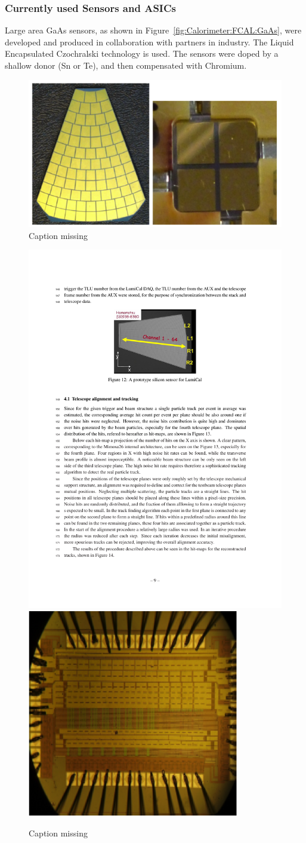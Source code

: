 \subsubsection{Currently used Sensors and ASICs}
Large area GaAs sensors, as shown in Figure~\ref{fig:Calorimeter:FCAL:GaAs}, were developed
and produced in collaboration with partners in industry. The Liquid Encapsulated
Czochralski technology is used. The sensors were
doped by a shallow donor (Sn or Te),
and then compensated  with Chromium.
\begin{figure}
    \centering
    \includegraphics[width=.7\textwidth]{Calorimeter/FCAL/figs/BeamCal}
    \caption{\color{red} Caption missing}
    \label{fig:Calorimeter:FCAL:BeamCalChips}
\end{figure}
\begin{figure}
    \centering
    \includegraphics[width=.4\textwidth]{Calorimeter/FCAL/figs/Hamamatsu_chip}\qquad
    \includegraphics[width=.4\textwidth]{Calorimeter/FCAL/figs/LumiCal}
    \caption{\color{red} Caption missing}
    \label{fig:Calorimeter:FCAL:LumiCal}
\end{figure}
